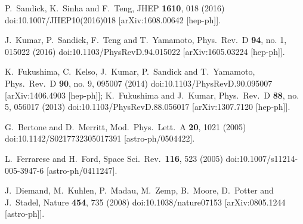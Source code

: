 \documentclass[11pt]{article}
\begin{document}
\begin{thebibliography}{99}
  P.~Sandick, K.~Sinha and F.~Teng,
  JHEP {\bf 1610}, 018 (2016)
  doi:10.1007/JHEP10(2016)018
  [arXiv:1608.00642 [hep-ph]].
  
  J.~Kumar, P.~Sandick, F.~Teng and T.~Yamamoto,
  Phys.\ Rev.\ D {\bf 94}, no. 1, 015022 (2016)
  doi:10.1103/PhysRevD.94.015022
  [arXiv:1605.03224 [hep-ph]].
  
  K.~Fukushima, C.~Kelso, J.~Kumar, P.~Sandick and T.~Yamamoto,
  Phys.\ Rev.\ D {\bf 90}, no. 9, 095007 (2014)
  doi:10.1103/PhysRevD.90.095007
  [arXiv:1406.4903 [hep-ph]];
  K.~Fukushima and J.~Kumar,
  Phys.\ Rev.\ D {\bf 88}, no. 5, 056017 (2013)
  doi:10.1103/PhysRevD.88.056017
  [arXiv:1307.7120 [hep-ph]].
    
  
  
  G.~Bertone and D.~Merritt,
  Mod.\ Phys.\ Lett.\ A {\bf 20}, 1021 (2005)
  doi:10.1142/S0217732305017391
  [astro-ph/0504422].
  
  
  L.~Ferrarese and H.~Ford,
  Space Sci.\ Rev.\  {\bf 116}, 523 (2005)
  doi:10.1007/s11214-005-3947-6
  [astro-ph/0411247].
  
  J.~Diemand, M.~Kuhlen, P.~Madau, M.~Zemp, B.~Moore, D.~Potter and J.~Stadel,
  Nature {\bf 454}, 735 (2008)
  doi:10.1038/nature07153
  [arXiv:0805.1244 [astro-ph]].
  

\end{thebibliography}
\end{document}
